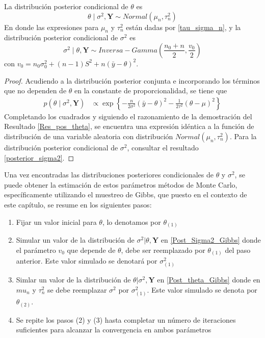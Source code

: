 \begin{Res}
La distribución posterior condicional de $\theta$ es
\begin{equation}\label{Post_theta_Gibbs}
\theta  \mid  \sigma^2,\mathbf{Y} \sim Normal(\mu_n,\tau_n^2)
\end{equation}
En donde las expresiones para $\mu_n$ y $\tau_n^2$ están dadas por \ref{tau_sigma_n}, y la distribución posterior condicional de $\sigma^2$ es 
\begin{equation}\label{Post_Sigma2_Gibbs}
\sigma^2  \mid  \theta,\mathbf{Y} \sim Inversa-Gamma\left(\dfrac{n_0+n}{2},\dfrac{v_0}{2}\right)
\end{equation}
con $v_0=n_0\sigma^2_0+(n-1)S^2+n(\bar{y}-\theta)^2$.
\end{Res}

\begin{proof}
Acudiendo a la distribución posterior conjunta e incorporando los términos que no dependen de $\theta$ en la constante de proporcionalidad, se tiene que
\begin{align*}
p(\theta \mid \sigma^2,\mathbf{Y})&\propto \exp\left\{-\frac{n}{2\sigma^2}(\bar{y}-\theta)^2-\frac{1}{2\tau^2}(\theta-\mu)^2\right\}
\end{align*}
Completando los cuadrados y siguiendo el razonamiento de la demostración del Resultado \ref{Res_pos_theta}, se encuentra una expresión idéntica a la función de distribución de una variable aleatoria con distribución $Normal(\mu_n, \tau^2_n)$. Para la distribución posterior condicional de $\sigma^2$, consultar el resultado \ref{posterior_sigma2}.
\end{proof}

Una vez encontradas las distribuciones posteriores condicionales de $\theta$ y $\sigma^2$, se puede obtener la estimación de estos parámetros métodos de Monte Carlo, específicamente utilizando el muestreo de Gibbs, que puesto en el contexto de este capítulo, se resume en los siguientes pasos:
\begin{enumerate}[(1)]
\item Fijar un valor inicial para $\theta$, lo denotamos por $\theta_{(1)}$
\item Simular un valor de la distribución de $\sigma^2|\theta,\mathbf{Y}$ en \ref{Post_Sigma2_Gibbs} donde el parámetro $v_0$ que depende de $\theta$, debe ser reemplazado por $\theta_{(1)}$ del paso anterior. Este valor simulado se denotará por $\sigma^2_{(1)}$
\item  Simlar un valor de la distribución de $\theta|\sigma^2,\mathbf{Y}$ en \ref{Post_theta_Gibbs} donde en $mu_n$ y $\tau^2_n$ se debe reemplazar $\sigma^2$ por $\sigma^2_{(1)}$. Este valor simulado se denota por $\theta_{(2)}$.
\item Se repite los pasos (2) y (3) hasta completar un número de iteraciones suficientes para alcanzar la convergencia en ambos parámetros
\end{enumerate}


